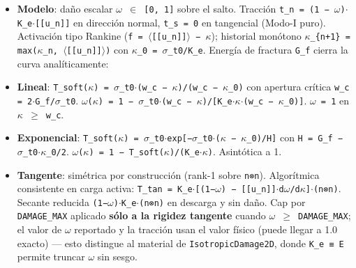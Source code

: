 \documentclass[11pt,letterpaper,oneside]{report}
\begin{document}
\begin{itemize}
  \item \textbf{Modelo}: daño escalar \texttt{\ensuremath{\omega} \ensuremath{\in} [0, 1]} sobre el salto. Tracción \texttt{t\_n = (1 − \ensuremath{\omega})\ensuremath{\cdot}K\_e\ensuremath{\cdot}[[u\_n]]} en dirección normal, \texttt{t\_s = 0} en tangencial (Modo-I puro). Activación tipo Rankine (\texttt{f = \ensuremath{\langle}[[u\_n]]\ensuremath{\rangle} − \ensuremath{\kappa}}); historial monótono \texttt{\ensuremath{\kappa}\_\{n+1\} = max(\ensuremath{\kappa}\_n, \ensuremath{\langle}[[u\_n]]\ensuremath{\rangle})} con \texttt{\ensuremath{\kappa}\_0 = \ensuremath{\sigma}\_t0/K\_e}. Energía de fractura \texttt{G\_f} cierra la curva analíticamente:
  \item \textbf{Lineal}: \texttt{T\_soft(\ensuremath{\kappa}) = \ensuremath{\sigma}\_t0\ensuremath{\cdot}(w\_c − \ensuremath{\kappa})/(w\_c − \ensuremath{\kappa}\_0)} con apertura crítica \texttt{w\_c = 2\ensuremath{\cdot}G\_f/\ensuremath{\sigma}\_t0}. \texttt{\ensuremath{\omega}(\ensuremath{\kappa}) = 1 − \ensuremath{\sigma}\_t0\ensuremath{\cdot}(w\_c − \ensuremath{\kappa})/[K\_e\ensuremath{\cdot}\ensuremath{\kappa}\ensuremath{\cdot}(w\_c − \ensuremath{\kappa}\_0)]}. \texttt{\ensuremath{\omega} = 1} en \texttt{\ensuremath{\kappa} \ensuremath{\ge} w\_c}.
  \item \textbf{Exponencial}: \texttt{T\_soft(\ensuremath{\kappa}) = \ensuremath{\sigma}\_t0\ensuremath{\cdot}exp[−\ensuremath{\sigma}\_t0\ensuremath{\cdot}(\ensuremath{\kappa} − \ensuremath{\kappa}\_0)/H]} con \texttt{H = G\_f − \ensuremath{\sigma}\_t0\ensuremath{\cdot}\ensuremath{\kappa}\_0/2}. \texttt{\ensuremath{\omega}(\ensuremath{\kappa}) = 1 − T\_soft(\ensuremath{\kappa})/(K\_e\ensuremath{\cdot}\ensuremath{\kappa})}. Asintótica a 1.
  \item \textbf{Tangente}: simétrica por construcción (rank-1 sobre \texttt{n⊗n}). Algorítmica consistente en carga activa: \texttt{T\_tan = K\_e\ensuremath{\cdot}[(1−\ensuremath{\omega}) − [[u\_n]]\ensuremath{\cdot}d\ensuremath{\omega}/d\ensuremath{\kappa}]\ensuremath{\cdot}(n⊗n)}. Secante reducida \texttt{(1−\ensuremath{\omega})\ensuremath{\cdot}K\_e\ensuremath{\cdot}(n⊗n)} en descarga y sin daño. Cap por \texttt{DAMAGE\_MAX} aplicado \textbf{sólo a la rigidez tangente} cuando \texttt{\ensuremath{\omega} \ensuremath{\ge} DAMAGE\_MAX}; el valor de \texttt{\ensuremath{\omega}} reportado y la tracción usan el valor físico (puede llegar a 1.0 exacto) --- esto distingue al material de \texttt{IsotropicDamage2D}, donde \texttt{K\_e ≡ E} permite truncar \ensuremath{\omega} sin sesgo.

\end{itemize}
\end{document}
